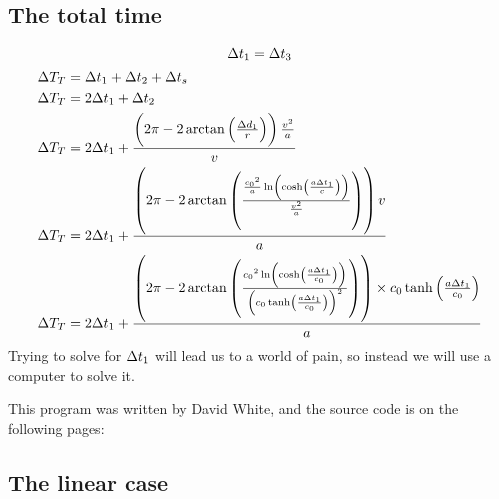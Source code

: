 	\subsection{The total time}
		\[\mathrm{\Delta} t_1 = \mathrm{\Delta} t_3\]
		\begin{align*}
			\Del T_T &= \Del t_1 + \Del t_2 + \Del t_s\\
			\Del T_T &= 2\Del t_1 + \Del t_2\\
			\Del T_T &= 2\Del t_1 + \frac{\left(2\pi - 2\arctan\left(\frac{\Del d_1}{r}\right)\right) \frac{v^2}{a}}{v}\\
			\Del T_T &= 2\Del t_1+\frac{\left(2\pi - 2\arctan\left(\frac{\frac{\si{\clight}^2}{a}\ln\left(\cosh\left(\frac{a\Del t_1}{c}\right)\right)}{\frac{v^2}{a}}\right)\right) v}{a}\\
			\Del T_T &= 2\Del t_1+\frac{\left(2\pi-2\arctan\left(\frac{\si{\clight}^2\ln\left(\cosh\left(\frac{a\Del t_1}{\si{\clight}}\right)\right)}{\left(\si{\clight}\tanh\left(\frac{a\Del t_1}{\si{\clight}}\right)\right)^2}\right)\right) \times \si{\clight}\tanh\left(\frac{a\Del t_1}{\si{\clight}}\right)}{a}
		\end{align*}
		Trying to solve for $\mathrm{\Delta} t_1$ will lead us to a world of pain, so instead we will use a computer to solve it.

		This program was written by David White, and the source code is on the following pages:
		\newpage
		
	\subsection{The linear case}
